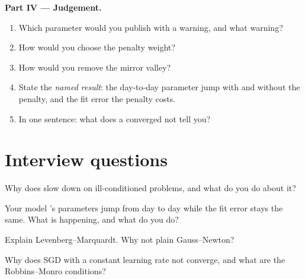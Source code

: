 \begin{problem}
\medskip\noindent\textbf{Part IV --- Judgement.}
\begin{enumerate}[resume]
\item Which parameter would you publish with a warning, and what warning?
\item How would you choose the penalty weight?
\item How would you remove the mirror valley?
\item State the \emph{named result}: the day-to-day parameter jump with and without the penalty, and the fit error the penalty costs.
\item In one sentence: what does a converged  not tell you?
\end{enumerate}
\end{problem}

\section{Interview questions}

\begin{interviewq}\label{iq:qm:numerical-optimisation-in-practice:1}
Why does  slow down on ill-conditioned problems, and what do you do about it?
\end{interviewq}

\begin{interviewq}\label{iq:qm:numerical-optimisation-in-practice:2}
Your model 's parameters jump from day to day while the fit error stays the same. What is happening, and what do you do?
\end{interviewq}

\begin{interviewq}\label{iq:qm:numerical-optimisation-in-practice:3}
Explain Levenberg--Marquardt. Why not plain Gauss--Newton?
\end{interviewq}

\begin{interviewq}\label{iq:qm:numerical-optimisation-in-practice:4}
Why does SGD with a constant learning rate not converge, and what are the Robbins--Monro conditions?
\end{interviewq}

